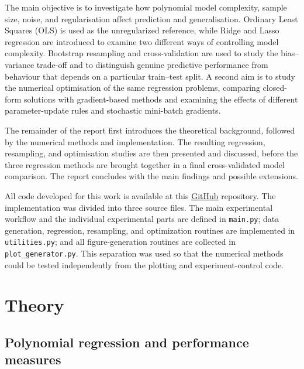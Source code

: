 \documentclass[aps,rmp,reprint,amsmath,amssymb,graphicx,longbibliography]{revtex4-1}
\begin{document}
The main objective is to investigate how polynomial model complexity, sample
size, noise, and regularisation affect prediction and generalisation. Ordinary
Least Squares (OLS) is used as the unregularized reference, while Ridge and
Lasso regression are introduced to examine two different ways of controlling
model complexity. Bootstrap resampling and cross-validation are used to study
the bias--variance trade-off and to distinguish genuine predictive performance
from behaviour that depends on a particular train--test split. A second aim is
to study the numerical optimisation of the same regression problems, comparing
closed-form solutions with gradient-based methods and examining the effects of
different parameter-update rules and stochastic mini-batch gradients.

The remainder of the report first introduces the theoretical background,
followed by the numerical methods and implementation. The resulting regression,
resampling, and optimisation studies are then presented and discussed, before
the three regression methods are brought together in a final cross-validated
model comparison. The report concludes with the main findings and possible
extensions. 

All code developed for this work is available at this 
\href{https://github.uio.no/teresm/Machine-Learning/tree/main/P1}{GitHub} repository. The implementation was divided into three source files. The main experimental
workflow and the individual experimental parts are defined in \texttt{main.py};
data generation, regression, resampling, and optimization routines are
implemented in \texttt{utilities.py}; and all figure-generation routines are
collected in \texttt{plot\_generator.py}. This separation was used so that
the numerical methods could be tested independently from the plotting and
experiment-control code.

\section{Theory}

\subsection{Polynomial regression and performance measures}
\label{subsec:polynomial_regression}
\end{document}
